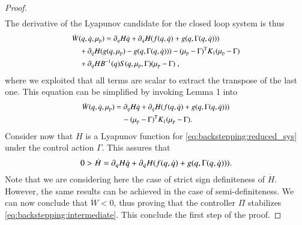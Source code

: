\begin{proof}
\begin{equation*}
\begin{split}
		\end{split}
	\end{equation*}
	The derivative of the Lyapunov candidate for the closed loop system is thus
	\begin{equation*}\small
	\begin{split}
	&\dot{W}(q,\dot{q},\mu_\mathrm{p}) =  \partial_{q} H \dot{q} + \partial_{\dot{q}} H (f(q,\dot{q}) + g(q,\Gamma(q,\dot{q}))) \\
	&\quad + \partial_{\dot{q}} H (g(q,\mu_\mathrm{p}) - g(q,\Gamma(q,\dot{q}))) - (\mu_\mathrm{p} - \Gamma)^{\mathrm{T}}K_1(\mu_\mathrm{p} - \Gamma) \\
	&\quad +  \partial_{\dot{q}} H B^{-1}(q) S(q,\mu_\mathrm{p},\Gamma) (\mu_\mathrm{p} - \Gamma)\;,
	\end{split}
	\end{equation*}
	where we exploited that all terms are scalar to extract the transpose of the last one. This equation can be  simplified by invoking Lemma 1 into
	\begin{equation}\small
	\begin{split}
	\dot{W}(q,\dot{q},\mu_\mathrm{p}) &=  \partial_{q} H \dot{q} + \partial_{\dot{q}} H (f(q,\dot{q}) + g(q,\Gamma(q,\dot{q}))) \\
	&\quad - (\mu_\mathrm{p} - \Gamma)^{\mathrm{T}}K_1(\mu_\mathrm{p} - \Gamma).
	\end{split}
	\end{equation}
	Consider now that $H$ is a Lyapunov function for \eqref{eq:backstepping:reduced_sys} under the control action $\Gamma$. This assures that
	\begin{equation}\small
		0 > \dot{H} = \partial_{q} H \dot{q} + \partial_{\dot{q}} H (f(q,\dot{q}) + g(q,\Gamma(q,\dot{q}))).
	\end{equation}
	Note that we are considering here the case of strict sign definiteness of $\dot{H}$. However, the same results can be achieved in the case of semi\--definiteness.
	We can now conclude that $\dot{W} < 0$, thus proving that the controller $\Pi$ stabilizes \eqref{eq:backstepping:intermediate}. This conclude the first step of the proof.
	

\end{proof}
